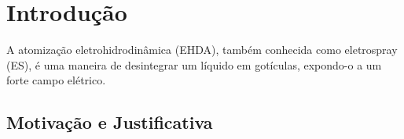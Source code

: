 \chapter{Introdução}
\label{chap:intro} %

A atomização eletrohidrodinâmica (EHDA), também conhecida como eletrospray (ES), é uma maneira de desintegrar um líquido
em gotículas, expondo-o a um forte campo elétrico. 






\section{Motivação e Justificativa}
\label{sec:motivacao}

